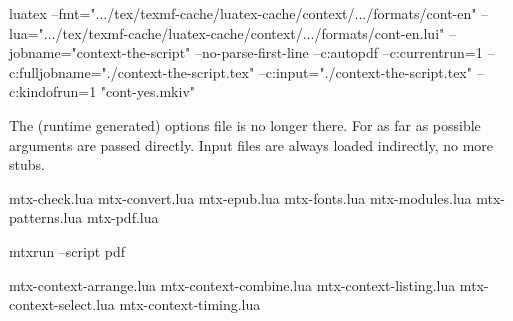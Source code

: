 \stopsubject

\StopSteps

\page

\StartSteps

\startsubject[title=Recent (probably unnoticed) change]

    \starttyping
    luatex
      --fmt=".../tex/texmf-cache/luatex-cache/context/.../formats/cont-en"
      --lua=".../tex/texmf-cache/luatex-cache/context/.../formats/cont-en.lui"
      --jobname="context-the-script"
      --no-parse-first-line
      --c:autopdf
      --c:currentrun=1
      --c:fulljobname="./context-the-script.tex"
      --c:input="./context-the-script.tex"
      --c:kindofrun=1
      "cont-yes.mkiv"
    \stoptyping \FlushStep

\stopsubject

\startsubject[title=Another change]

\startitemize[packed]

    \startitem The (runtime generated) options file is no longer there. \stopitem \FlushStep
    \startitem For as far as possible arguments are passed directly. \stopitem \FlushStep
    \startitem Input files are always loaded indirectly, no more stubs. \stopitem \FlushStep

\stopitemize

\stopsubject

\StopSteps

\page

\StartSteps

\startsubject[title=About 30 mtx/lmx scripts]

    \starttyping
    mtx-check.lua
    mtx-convert.lua
    mtx-epub.lua
    mtx-fonts.lua
    mtx-modules.lua
    mtx-patterns.lua
    mtx-pdf.lua
    \stoptyping \FlushStep

\stopsubject

\startsubject[title=These are run like]

    \starttyping
    mtxrun --script pdf
    \stoptyping \FlushStep

\stopsubject

\StopSteps

\page

\StartSteps

\startsubject[title=Several mtx templates]

    \starttyping
    mtx-context-arrange.lua
    mtx-context-combine.lua
    mtx-context-listing.lua
    mtx-context-select.lua
    mtx-context-timing.lua
    \stoptyping \FlushStep

